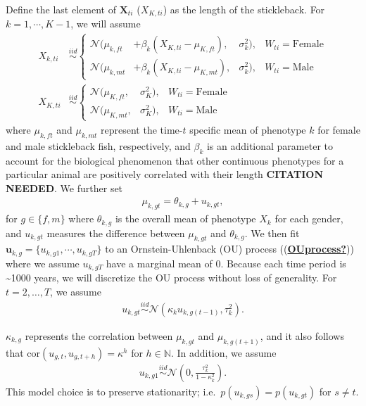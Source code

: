 \documentclass[
  12pt,
]{article}
\begin{document}
Define the last element of \(\boldsymbol{X}_{ti}\) (\(X_{K,ti}\)) as the
length of the stickleback. For \(k = 1,\cdots,K - 1\), we will assume
\begin{align}
{X}_{k,ti} & \overset{iid}{\sim}\left\{\begin{array}{llll} \mathcal{N}(\mu_{k,ft} & + \beta_k(X_{K,ti} - \mu_{K,ft}),&\sigma_k^2), & W_{ti} = \text{Female} \\ \mathcal{N}(\mu_{k,mt} & + \beta_k(X_{K,ti} - \mu_{K,mt}),&\sigma_k^2), & W_{ti} = \text{Male} \end{array}\right. \\
{X}_{K,ti} & \overset{iid}{\sim}\left\{\begin{array}{lll} \mathcal{N}(\mu_{K,ft},&\sigma_{K}^2), & W_{ti} = \text{Female} \\ \mathcal{N}(\mu_{K,mt},&\sigma_{K}^2), & W_{ti} = \text{Male} \end{array}\right.
\label{eq:X}
\end{align} where \(\mu_{k,ft}\) and \(\mu_{k,mt}\) represent the
time-\(t\) specific mean of phenotype \(k\) for female and male
stickleback fish, respectively, and \(\beta_k\) is an additional
parameter to account for the biological phenomenon that other continuous
phenotypes for a particular animal are positively correlated with their
length \textbf{CITATION NEEDED}. We further set \begin{align}
\mu_{k,gt} = \theta_{k,g} + u_{k,gt},
\label{eq:mu}
\end{align} for \(g \in \{f,m\}\) where \(\theta_{k,g}\) is the overall
mean of phenotype \(X_k\) for each gender, and \(u_{k,gt}\) measures the
difference between \(\mu_{k,gt}\) and \(\theta_{k,g}\). We then fit
\(\boldsymbol{u}_{k,g} = \{u_{k,g1},\cdots,u_{k,gT}\}\) to an
Ornstein-Uhlenback (OU) process
((\protect\hyperlink{ref-OUprocess}{\textbf{OUprocess?}})) where we
assume \(u_{k,gT}\) have a marginal mean of 0. Because each time period
is \textasciitilde1000 years, we will discretize the OU process without
loss of generality. For \(t = 2,\ldots,T\), we assume \begin{align}
u_{k,gt} \overset{iid}{\sim}\mathcal{N}(\kappa_{k} u_{k,g(t-1)} , \tau_k^2).
\label{eq:u_ar1}
\end{align}

\(\kappa_{k,g}\) represents the correlation between \(\mu_{k,gt}\) and
\(\mu_{k,g(t+1)}\), and it also follows that
\(\text{cor}(u_{g,t},u_{g,t+h}) = \kappa^h\) for \(h \in \mathbb{N}\).
In addition, we assume \begin{align}
u_{k,g1} \overset{iid}{\sim}\mathcal{N}\left(0,\frac{\tau_k^2}{1-\kappa_{k}^2}\right).
\label{eq:u1}
\end{align} This model choice is to preserve stationarity;
i.e.~\(p(u_{k,gs}) = p(u_{k,gt})\) for \(s \neq t\).
\end{document}
